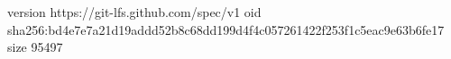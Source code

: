 version https://git-lfs.github.com/spec/v1
oid sha256:bd4e7e7a21d19addd52b8c68dd199d4f4c057261422f253f1c5eac9e63b6fe17
size 95497
